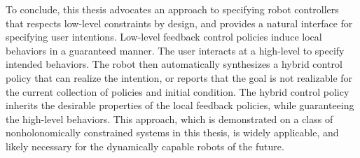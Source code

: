 \vspace{0.5in}

To conclude, this thesis advocates an approach to specifying robot controllers that
respects low-level constraints by design, and provides a natural interface for
specifying user intentions.  Low-level feedback control policies induce local
behaviors in a guaranteed manner.  The user interacts at a high-level to specify
intended behaviors.  The robot then automatically synthesizes a hybrid control policy
that can realize the intention, or reports that the goal is not realizable for the
current collection of policies and initial condition.  The hybrid control policy
inherits the desirable properties of the local feedback policies, while guaranteeing
the high-level behaviors.  This approach, which is demonstrated on a class of
nonholonomically constrained systems in this thesis, is widely applicable, and
likely necessary for the dynamically capable robots of the future.



